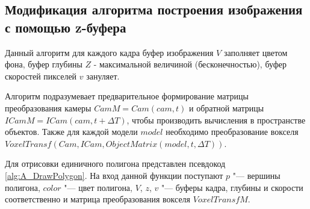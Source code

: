 \subsection{Модификация алгоритма построения изображения с помощью z-буфера}


Данный алгоритм для каждого кадра буфер изображения $V$ заполняет цветом фона, буфер глубины $Z$ - максимальной величиной (бесконечностью), буфер скоростей пикселей $v$ зануляет. 

Алгоритм подразумевает предварительное формирование матрицы преобразования камеры $CamM = Cam(cam, t)$ и обратной матрицы $ICamM = ICam(cam, t + \Delta T)$, чтобы производить вычисления в пространстве объектов. Также для каждой модели $model$ необходимо преобразование вокселя $VoxelTransf(Cam, ICam, ObjectMatrix(model, t, \Delta T))$.  

Для отрисовки единичного полигона представлен псевдокод \ref{alg:A_DrawPolygon}.  На вход данной функции поступают $p$ "--- вершины полигона, $color$ "--- цвет полигона, $V$, $z$, $v$ "--- буферы кадра, глубины и скорости соответственно и матрица преобразования вокселя $VoxelTransfM$.


